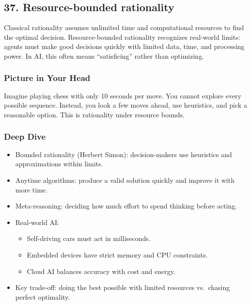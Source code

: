 \documentclass[
  letterpaper,
  DIV=11,
  numbers=noendperiod]{scrreprt}
\providecommand{\tightlist}{%
  \setlength{\itemsep}{0pt}\setlength{\parskip}{0pt}}
\begin{document}
\subsection{37. Resource-bounded
rationality}\label{resource-bounded-rationality}

Classical rationality assumes unlimited time and computational resources
to find the optimal decision. Resource-bounded rationality recognizes
real-world limits: agents must make good decisions quickly with limited
data, time, and processing power. In AI, this often means
``satisficing'' rather than optimizing.

\subsubsection{Picture in Your Head}\label{picture-in-your-head-36}

Imagine playing chess with only 10 seconds per move. You cannot explore
every possible sequence. Instead, you look a few moves ahead, use
heuristics, and pick a reasonable option. This is rationality under
resource bounds.

\subsubsection{Deep Dive}\label{deep-dive-36}

\begin{itemize}
\item
  Bounded rationality (Herbert Simon): decision-makers use heuristics
  and approximations within limits.
\item
  Anytime algorithms: produce a valid solution quickly and improve it
  with more time.
\item
  Meta-reasoning: deciding how much effort to spend thinking before
  acting.
\item
  Real-world AI:

  \begin{itemize}
  \tightlist
  \item
    Self-driving cars must act in milliseconds.
  \item
    Embedded devices have strict memory and CPU constraints.
  \item
    Cloud AI balances accuracy with cost and energy.
  \end{itemize}
\item
  Key trade-off: doing the best possible with limited resources
  vs.~chasing perfect optimality.
\end{itemize}
\end{document}
